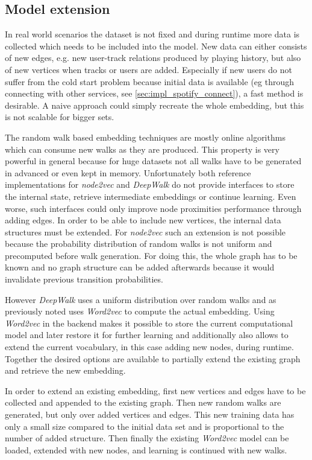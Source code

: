 \documentclass[sigconf]{acmart}
\begin{document}
\subsection{Model extension}
In real world scenarios the dataset is not fixed and during runtime more data is collected which needs to be included into the model. New data can either consists of new edges, e.g. new user-track relations produced by playing history, but also of new vertices when tracks or users are added. Especially if new users do not suffer from the cold start problem because initial data is available (eg through connecting with other services, see \ref{sec:impl_spotify_connect}), a fast method is desirable. A naive approach could simply recreate the whole embedding, but this is not scalable for bigger sets. 

The random walk based embedding techniques are mostly online algorithms which can consume new walks as they are produced. This property is very powerful in general because for huge datasets not all walks have to be generated in advanced or even kept in memory. Unfortunately both reference implementations for \emph{node2vec} and \emph{DeepWalk} do not provide interfaces to store the internal state, retrieve intermediate embeddings or continue learning. Even worse, such interfaces could only improve node proximities performance through adding edges. In order to be able to include new vertices, the internal data structures must be extended. For \emph{node2vec} such an extension is not possible because the probability distribution of random walks is not uniform and precomputed before walk generation. For doing this, the whole graph has to be known and no graph structure can be added afterwards because it would invalidate previous transition probabilities.

However \emph{DeepWalk} uses a uniform distribution over random walks and as previously noted uses \emph{Word2vec} to compute the actual embedding. Using  \emph{Word2vec} in the backend makes it possible to store the current computational model and later restore it for further learning and additionally also allows to extend the current vocabulary, in this case adding new nodes, during runtime. Together the desired options are available to partially extend the existing graph and retrieve the new embedding.

In order to extend an existing embedding, first new vertices and edges have to be collected and appended to the existing graph. Then new random walks are generated, but only over added vertices and edges. This new training data has only a small size compared to the initial data set and is proportional to the number of added structure. Then finally the existing \emph{Word2vec} model can be loaded, extended with new nodes, and learning is continued with new walks. \\
\end{document}
